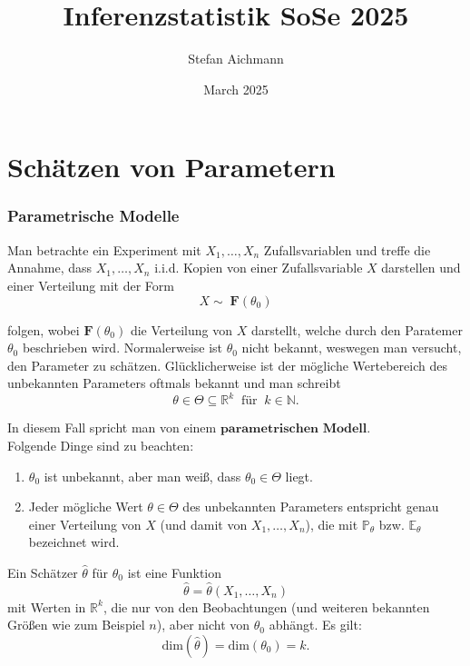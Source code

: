 \documentclass[10pt]{article}
\title{Inferenzstatistik SoSe 2025}
\author{Stefan Aichmann} %
\date{March 2025}
\newcommand{\FZV}{X_1, \ldots, X_n} %
\newcommand{\IR}{\mathbb{R}} %
\begin{document}
	
	\maketitle \newpage
	\tableofcontents \newpage
	
	\part{Schätzen von Parametern}
	
	\section{Parametrische Modelle}
	Man betrachte ein Experiment mit $\FZV$ Zufallsvariablen und treffe die Annahme, dass $\FZV$ i.i.d. Kopien von einer Zufallsvariable $X$ darstellen und einer Verteilung mit der Form
	\begin{equation*}
	 X \sim \; \textbf{F}(\theta_0)
	\end{equation*}
	
	\noindent folgen, wobei $\textbf{F}(\theta_0)$ die Verteilung von $X$ darstellt, welche durch den Paratemer $\theta_0$ beschrieben wird. Normalerweise ist $\theta_0$ nicht bekannt, weswegen  man versucht, den Parameter zu schätzen. Glücklicherweise ist der mögliche Wertebereich des unbekannten Parameters oftmals bekannt und man schreibt
	\begin{equation*}
		\theta \in \Theta \subseteq \IR^k \;\; \text{für} \;\; k \in \mathbb{N}.
	\end{equation*}
	
	\noindent In diesem Fall spricht man von einem $\textbf{parametrischen Modell}$.\\
	Folgende Dinge sind zu beachten: 
	
	\begin{enumerate}
      \item $\theta_0$ ist unbekannt, aber man weiß, dass $\theta_0 \in \Theta$ liegt. 
      \item  Jeder mögliche Wert $\theta \in \Theta$ des unbekannten Parameters entspricht genau einer Verteilung von $X$ (und damit von $\FZV$), die mit $\mathbb{P}_\theta$ bzw. $\mathbb{E}_\theta$ bezeichnet wird.
	\end{enumerate}
	
	
	\begin{Definition}
		Ein Schätzer $\hat{\theta}$ für $\theta_0$ ist eine Funktion 
		\begin{equation*}
				\hat{\theta} = \hat{\theta} (\FZV)
		\end{equation*}
	 mit Werten in $\IR ^k$, die nur von den Beobachtungen (und weiteren bekannten Größen wie zum Beispiel $n$), aber nicht von $\theta_0$ abhängt.
	 Es gilt:
	 \begin{equation*}
	 	\text{dim}(\hat{\theta}) = \text{dim}(\theta_0) = k.
	 \end{equation*}
	\end{Definition}
	 
\end{document}

